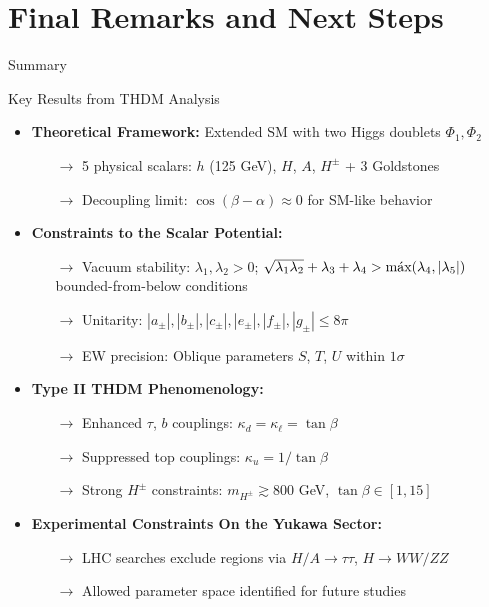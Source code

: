 \documentclass{../bredelebeamer}
\begin{document}
\section{Final Remarks and Next Steps}
\begin{frame}{Summary}
    \begin{block}{Key Results from THDM Analysis}
        \begin{itemize}
            \item \textbf{Theoretical Framework:} Extended SM with two Higgs doublets $\Phi_1, \Phi_2$ 
            \begin{itemize}
                \item[$\rightarrow$] 5 physical scalars: $h$ (125 GeV), $H$, $A$, $H^\pm$ + 3 Goldstones
                \item[$\rightarrow$] Decoupling limit: $\cos(\beta-\alpha) \approx 0$ for SM-like behavior
            \end{itemize}
            
            \item \textbf{Constraints to the Scalar Potential:}
            \begin{itemize}
                \item[$\rightarrow$] Vacuum stability: $\lambda_1, \lambda_2 > 0$; $\sqrt{\lambda_1\lambda_2}+\lambda_3+\lambda_4 > \text{máx}(\lambda_4, \abs{\lambda_5})$ bounded-from-below conditions
                \item[$\rightarrow$] Unitarity: $|a_\pm|, |b_\pm|, |c_\pm|, |e_\pm|, |f_\pm|, |g_\pm| \leq 8\pi$
                \item[$\rightarrow$] EW precision: Oblique parameters $S$, $T$, $U$ within $1\sigma$
            \end{itemize}
            
            \item \textbf{Type II THDM Phenomenology:}
            \begin{itemize}
                \item[$\rightarrow$] Enhanced $\tau$, $b$ couplings: $\kappa_d = \kappa_\ell = \tan\beta$
                \item[$\rightarrow$] Suppressed top couplings: $\kappa_u = 1/\tan\beta$
                \item[$\rightarrow$] Strong $H^\pm$ constraints: $m_{H^\pm} \gtrsim 800$ GeV, $\tan\beta \in [1,15]$
            \end{itemize}
            
            \item \textbf{Experimental Constraints On the Yukawa Sector:}
            \begin{itemize}
                \item[$\rightarrow$] LHC searches exclude regions via $H/A \to \tau\tau$, $H \to WW/ZZ$
                \item[$\rightarrow$] Allowed parameter space identified for future studies
            \end{itemize}
        \end{itemize}
    \end{block}
    

\end{frame}
\end{document}
